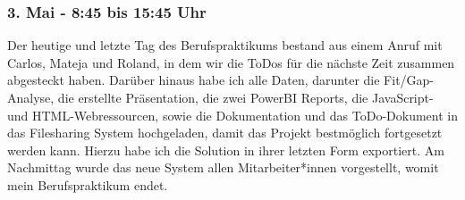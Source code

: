 \subsubsection*{3. Mai - 8:45 bis 15:45 Uhr}
Der heutige und letzte Tag des Berufspraktikums bestand aus einem Anruf mit Carlos, Mateja und Roland, in dem wir die ToDos für die nächste Zeit zusammen abgesteckt haben. Darüber hinaus habe ich alle Daten, darunter die Fit/Gap-Analyse, die erstellte Präsentation, die zwei PowerBI Reports, die JavaScript- und HTML-Webressourcen, sowie die Dokumentation und das ToDo-Dokument in das Filesharing System hochgeladen, damit das Projekt bestmöglich fortgesetzt werden kann. Hierzu habe ich die Solution in ihrer letzten Form exportiert. Am Nachmittag wurde das neue System allen Mitarbeiter*innen vorgestellt, womit mein Berufspraktikum endet.